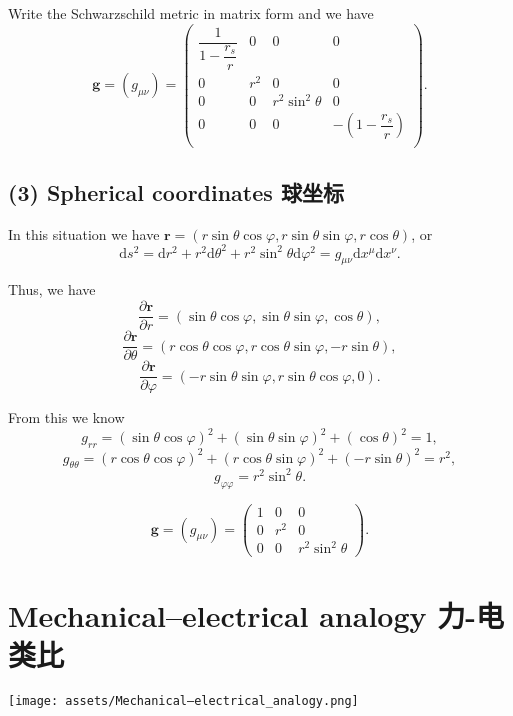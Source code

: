 Write the Schwarzschild metric in matrix form and we have
\[\mathbf{g} = (g_{\mu\nu}) = \begin{pmatrix}
    \dfrac{1}{1 - \dfrac{r_s}{r}} & 0 & 0 & 0 \\
    0 & r^2 & 0 & 0 \\
    0 & 0 & r^2 \sin^2 \theta & 0 \\
    0 & 0 & 0 & - \left( 1 - \dfrac{r_s}{r} \right) \\
\end{pmatrix}.\]

\subsection*{(3) Spherical coordinates
球坐标}\label{spherical-coordinates-ux7403ux5750ux6807}

In this situation we have
\(\boldsymbol{r} = (r \sin \theta \cos \varphi, r \sin \theta \sin \varphi, r \cos \theta)\),
or
\[\mathrm{d} s^2 = \mathrm{d}r^2 + r^2 \mathrm{d} \theta^2 + r^2 \sin^2 \theta \mathrm{d} \varphi^2 = g_{\mu\nu} \mathrm{d}x^{\mu} \mathrm{d}x^{\nu}.\]

Thus, we have
\[\frac{\partial \boldsymbol{r}}{\partial r} = (\sin \theta \cos \varphi, \sin \theta \sin \varphi, \cos \theta),\]
\[\frac{\partial \boldsymbol{r}}{\partial \theta} = (r \cos \theta \cos \varphi, r \cos \theta \sin \varphi, - r \sin \theta),\]
\[\frac{\partial \boldsymbol{r}}{\partial \varphi} = (- r \sin \theta \sin \varphi, r \sin \theta \cos \varphi, 0).\]

From this we know
\[g_{rr} = (\sin \theta \cos \varphi)^2 + (\sin \theta \sin \varphi)^2 + (\cos \theta)^2 = 1,\]
\[g_{\theta \theta} = (r \cos \theta \cos \varphi)^2 + (r \cos \theta \sin \varphi)^2 + (- r \sin \theta)^2 = r^2,\]
\[g_{\varphi \varphi} = r^2 \sin^2 \theta.\]

\[\mathbf{g} = (g_{\mu\nu}) = \begin{pmatrix}
    1 & 0 & 0 \\
    0 & r^2 & 0 \\
    0 & 0 & r^2 \sin^2 \theta
\end{pmatrix}.\]

\section{Mechanical--electrical analogy
力-电类比}\label{mechanicalelectrical-analogy-ux529b-ux7535ux7c7bux6bd4}

\begin{center}
    \texttt{[image: assets/Mechanical–electrical\_analogy.png]}
\end{center}

